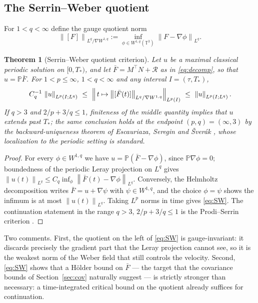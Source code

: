 \documentclass[11pt,reqno]{amsart}
\newcommand{\T}{\mathbb{T}}
\newcommand{\norm}[1]{\left\lVert #1\right\rVert}
\newcommand{\Leray}{\mathbb{P}}
\newtheorem{theorem}{Theorem}[section]
\theoremstyle{definition}
\begin{document}
\subsection{The Serrin--Weber quotient}

For $1<q<\infty$ define the gauge quotient norm
\[
  \norm{[F]}_{L^q/\nabla W^{1,q}}:=\inf_{\phi\in W^{1,q}(\T^3)}\norm{F-\nabla\phi}_{L^q} .
\]

\begin{theorem}[Serrin--Weber quotient criterion]\label{thm:SW}
Let $u$ be a maximal classical periodic solution on $[0,T_*)$, and let
$\bar F=M^\top N+\mathcal R$ as in \eqref{eq:decomp}, so that $u=\Leray\bar F$. For
$1<p\le\infty$, $1<q<\infty$ and any interval $I=(\tau,T_*)$,
\begin{equation}\label{eq:SW}
  C_q^{-1}\,\norm{u}_{L^p(I;L^q)}
  \ \le\ \Bigl\|\,t\mapsto\norm{[\bar F(t)]}_{L^q/\nabla W^{1,q}}\Bigr\|_{L^p(I)}
  \ \le\ \norm{u}_{L^p(I;L^q)} .
\end{equation}
If $q>3$ and $2/p+3/q\le1$, finiteness of the middle quantity implies that $u$ extends
past $T_*$; the same conclusion holds at the endpoint $(p,q)=(\infty,3)$ by the
backward-uniqueness theorem of Escauriaza, Seregin and \v Sver\'ak
\cite{EscauriazaSereginSverak2003}, whose localization to the periodic setting is
standard.
\end{theorem}

\begin{proof}
For every $\phi\in W^{1,q}$ we have $u=\Leray(\bar F-\nabla\phi)$, since
$\Leray\nabla\phi=0$; boundedness of the periodic Leray projection on $L^q$ gives
$\norm{u(t)}_{L^q}\le C_q\inf_\phi\norm{\bar F(t)-\nabla\phi}_{L^q}$. Conversely, the
Helmholtz decomposition writes $\bar F=u+\nabla\psi$ with $\psi\in W^{1,q}$, and the
choice $\phi=\psi$ shows the infimum is at most $\norm{u(t)}_{L^q}$. Taking $L^p$ norms in
time gives \eqref{eq:SW}. The continuation statement in the range $q>3$,
$2/p+3/q\le1$ is the Prodi--Serrin criterion \cite{Prodi1959,Serrin1963}.
\end{proof}

Two comments. First, the quotient on the left of \eqref{eq:SW} is gauge-invariant: it
discards precisely the gradient part that the Leray projection cannot see, so it is the
weakest norm of the Weber field that still controls the velocity. Second,
\eqref{eq:SW} shows that a H\"older bound on $\bar F$ --- the target that the covariance
bounds of Section~\ref{sec:cov} naturally suggest --- is strictly stronger than necessary:
a time-integrated critical bound on the quotient already suffices for continuation.
\end{document}
